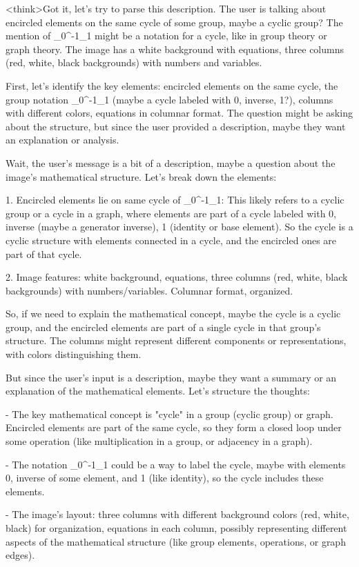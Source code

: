 <think>Got it, let's try to parse this description. The user is talking about encircled elements on the same cycle of some group, maybe a cyclic group? The mention of _0^-1_1 might be a notation for a cycle, like in group theory or graph theory. The image has a white background with equations, three columns (red, white, black backgrounds) with numbers and variables. 

First, let's identify the key elements: encircled elements on the same cycle, the group notation _0^-1_1 (maybe a cycle labeled with 0, inverse, 1?), columns with different colors, equations in columnar format. The question might be asking about the structure, but since the user provided a description, maybe they want an explanation or analysis.

Wait, the user's message is a bit of a description, maybe a question about the image's mathematical structure. Let's break down the elements:

1. Encircled elements lie on same cycle of _0^-1_1: This likely refers to a cyclic group or a cycle in a graph, where elements are part of a cycle labeled with 0, inverse (maybe a generator inverse), 1 (identity or base element). So the cycle is a cyclic structure with elements connected in a cycle, and the encircled ones are part of that cycle.

2. Image features: white background, equations, three columns (red, white, black backgrounds) with numbers/variables. Columnar format, organized.

So, if we need to explain the mathematical concept, maybe the cycle is a cyclic group, and the encircled elements are part of a single cycle in that group's structure. The columns might represent different components or representations, with colors distinguishing them.

But since the user's input is a description, maybe they want a summary or an explanation of the mathematical elements. Let's structure the thoughts:

- The key mathematical concept is "cycle" in a group (cyclic group) or graph. Encircled elements are part of the same cycle, so they form a closed loop under some operation (like multiplication in a group, or adjacency in a graph).

- The notation _0^-1_1 could be a way to label the cycle, maybe with elements 0, inverse of some element, and 1 (like identity), so the cycle includes these elements.

- The image's layout: three columns with different background colors (red, white, black) for organization, equations in each column, possibly representing different aspects of the mathematical structure (like group elements, operations, or graph edges).


